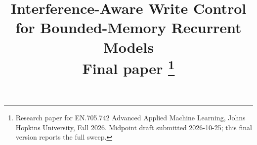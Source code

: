 \documentclass[conference]{IEEEtran}
\begin{document}
\title{Interference-Aware Write Control for Bounded-Memory Recurrent Models\\
{\footnotesize Final paper}
\thanks{Research paper for EN.705.742 Advanced Applied Machine Learning,
Johns Hopkins University, Fall 2026. Midpoint draft submitted 2026-10-25;
this final version reports the full sweep.}
}

\author{
}

\maketitle
\end{document}
